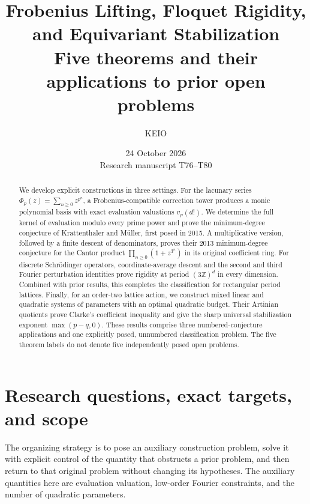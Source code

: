 \documentclass[11pt,a4paper]{article}
\title{Frobenius Lifting, Floquet Rigidity,\\and Equivariant Stabilization\\[5pt]\large Five theorems and their applications to prior open problems}
\author{KEIO}
\date{24 October 2026\\[3pt]\small Research manuscript T76--T80}
\theoremstyle{definition}
\theoremstyle{remark}\newtheorem{remark}[lemma]{Remark}
\begin{document}
\maketitle
\begin{abstract}
We develop explicit constructions in three settings. For the lacunary series
$\Phi_p(z)=\sum_{n\geq0}z^{p^n}$, a Frobenius-compatible correction tower
produces a monic polynomial basis with exact evaluation valuations $v_p(d!)$.
We determine the full kernel of evaluation modulo every prime power and prove
the minimum-degree conjecture of Krattenthaler and M\"uller, first posed in
2015. A multiplicative version, followed by a finite descent of denominators,
proves their 2013 minimum-degree conjecture for the Cantor product
$\prod_{n\geq0}(1+z^{3^n})$ in its original coefficient ring.
For discrete Schr\"odinger operators, coordinate-average descent and the
second and third Fourier perturbation identities prove rigidity at period
$(3\mathbb Z)^d$ in every dimension. Combined with prior results, this completes
the classification for rectangular period lattices.
Finally, for an order-two lattice action, we construct mixed linear and
quadratic systems of parameters with an optimal quadratic budget. Their
Artinian quotients prove Clarke's coefficient inequality and give the sharp
universal stabilization exponent $\max(p-q,0)$.
These results comprise three numbered-conjecture applications and one
explicitly posed, unnumbered classification problem. The five theorem labels
do not denote five independently posed open problems.
\end{abstract}

\section{Research questions, exact targets, and scope}

The organizing strategy is to pose an auxiliary construction problem, solve
it with explicit control of the quantity that obstructs a prior problem,
and then return to that original problem without changing its hypotheses.
The auxiliary quantities here are evaluation valuation, low-order Fourier
constraints, and the number of quadratic parameters.
\end{document}
